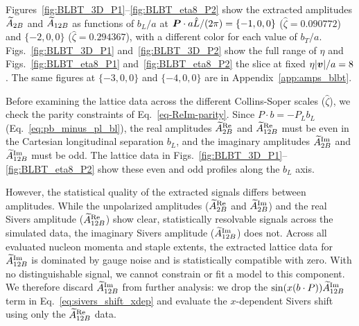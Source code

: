Figures~\ref{fig:BLBT_3D_P1}--\ref{fig:BLBT_eta8_P2} show the extracted amplitudes $\widetilde{A}_{2B}$ and $\widetilde{A}_{12B}$ as functions of $b_L/a$ at $\boldsymbol{P}\cdot a\hat{L}/(2\pi)=\{-1,0,0\}$ ($\hat\zeta=0.090772$) and $\{-2,0,0\}$ ($\hat\zeta=0.294367$), with a different color for each value of $b_T/a$. Figs.~\ref{fig:BLBT_3D_P1} and~\ref{fig:BLBT_3D_P2} show the full range of $\eta$ and Figs.~\ref{fig:BLBT_eta8_P1} and~\ref{fig:BLBT_eta8_P2} the slice at fixed $\eta|\boldsymbol{v}|/a=8$. The same figures at $\{-3,0,0\}$ and $\{-4,0,0\}$ are in Appendix~\ref{app:amps_blbt}.

Before examining the lattice data across the different Collins-Soper scales ($\hat{\zeta}$), we check the parity constraints of Eq.~\eqref{eq-ReIm-parity}. Since $P\cdot b=-P_Lb_L$ (Eq.~\eqref{eq:pb_minus_pl_bl}), the real amplitudes $\widetilde{A}_{2B}^{\text{Re}}$ and $\widetilde{A}_{12B}^{\text{Re}}$ must be even in the Cartesian longitudinal separation $b_L$, and the imaginary amplitudes $\widetilde{A}_{2B}^{\text{Im}}$ and $\widetilde{A}_{12B}^{\text{Im}}$ must be odd. The lattice data in Figs.~\ref{fig:BLBT_3D_P1}--\ref{fig:BLBT_eta8_P2} show these even and odd profiles along the $b_L$ axis. %

However, the statistical quality of the extracted signals differs between amplitudes. While the unpolarized amplitudes ($\widetilde{A}_{2B}^{\text{Re}}$ and $\widetilde{A}_{2B}^{\text{Im}}$) and the real Sivers amplitude ($\widetilde{A}_{12B}^{\text{Re}}$) show clear, statistically resolvable signals across the simulated data, the imaginary Sivers amplitude ($\widetilde{A}_{12B}^{\text{Im}}$) does not. Across all evaluated nucleon momenta and staple extents, the extracted lattice data for $\widetilde{A}_{12B}^{\text{Im}}$ is dominated by gauge noise and is statistically compatible with zero. With no distinguishable signal, we cannot constrain or fit a model to this component. We therefore discard $\widetilde{A}_{12B}^{\text{Im}}$ from further analysis: we drop the $\sin(x(b\cdot P))\widetilde{A}_{12B}^{\text{Im}}$ term in Eq.~\eqref{eq:sivers_shift_xdep} and evaluate the $x$-dependent Sivers shift using only the $\widetilde{A}_{12B}^{\text{Re}}$ data. %

